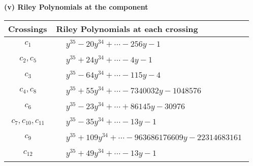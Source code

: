 \documentclass[1p]{elsarticle_modified}
\theoremstyle{definition}
\begin{document}
\newpage\renewcommand{\arraystretch}{1}
\flushleft \textbf{(v) Riley Polynomials at the component}\newline \\
\begin{tabular}{m{50pt}|m{274pt}}
Crossings & \hspace{64pt}Riley Polynomials at each crossing \\
\hline $$\begin{aligned}c_{1}\end{aligned}$$&$\begin{aligned}
&y^{35}-20 y^{34}+\cdots-256 y-1
\end{aligned}$\\
\hline $$\begin{aligned}c_{2},c_{5}\end{aligned}$$&$\begin{aligned}
&y^{35}+24 y^{34}+\cdots-4 y-1
\end{aligned}$\\
\hline $$\begin{aligned}c_{3}\end{aligned}$$&$\begin{aligned}
&y^{35}-64 y^{34}+\cdots-115 y-4
\end{aligned}$\\
\hline $$\begin{aligned}c_{4},c_{8}\end{aligned}$$&$\begin{aligned}
&y^{35}+55 y^{34}+\cdots-7340032 y-1048576
\end{aligned}$\\
\hline $$\begin{aligned}c_{6}\end{aligned}$$&$\begin{aligned}
&y^{35}-23 y^{34}+\cdots+86145 y-30976
\end{aligned}$\\
\hline $$\begin{aligned}c_{7},c_{10},c_{11}\end{aligned}$$&$\begin{aligned}
&y^{35}-35 y^{34}+\cdots-13 y-1
\end{aligned}$\\
\hline $$\begin{aligned}c_{9}\end{aligned}$$&$\begin{aligned}
&y^{35}+109 y^{34}+\cdots-963686176609 y-22314683161
\end{aligned}$\\
\hline $$\begin{aligned}c_{12}\end{aligned}$$&$\begin{aligned}
&y^{35}+49 y^{34}+\cdots-13 y-1
\end{aligned}$\\
\hline
\end{tabular}\\~\\
\end{document}
